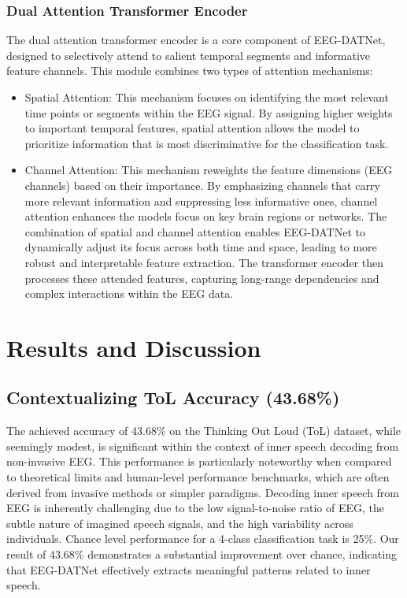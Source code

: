 \documentclass[pdflatex,sn-mathphys-num]{sn-jnl}
\theoremstyle{thmstyleone}%
\theoremstyle{thmstyletwo}%
\theoremstyle{thmstylethree}%
\begin{document}
\subsubsection{Dual Attention Transformer Encoder}

The dual attention transformer encoder is a core component of EEG-DATNet, designed to selectively attend to salient temporal segments and informative feature channels. This module combines two types of attention mechanisms:

\begin{itemize}
\item Spatial Attention: This mechanism focuses on identifying the most relevant time points or segments within the EEG signal. By assigning higher weights to important temporal features, spatial attention allows the model to prioritize information that is most discriminative for the classification task.
\item Channel Attention: This mechanism reweights the feature dimensions (EEG channels) based on their importance. By emphasizing channels that carry more relevant information and suppressing less informative ones, channel attention enhances the model\textquotesingle s focus on key brain regions or networks. The combination of spatial and channel attention enables EEG-DATNet to dynamically adjust its focus across both time and space, leading to more robust and interpretable feature extraction. The transformer encoder then processes these attended features, capturing long-range dependencies and complex interactions within the EEG data.
\end{itemize}

\section{Results and Discussion}

\subsection{Contextualizing ToL Accuracy (43.68\%)}

The achieved accuracy of 43.68\% on the Thinking Out Loud (ToL) dataset, while seemingly modest, is significant within the context of inner speech decoding from non-invasive EEG. This performance is particularly noteworthy when compared to theoretical limits and human-level performance benchmarks, which are often derived from invasive methods or simpler paradigms. Decoding inner speech from EEG is inherently challenging due to the low signal-to-noise ratio of EEG, the subtle nature of imagined speech signals, and the high variability across individuals. Chance level performance for a 4-class classification task is 25\%. Our result of 43.68\% demonstrates a substantial improvement over chance, indicating that EEG-DATNet effectively extracts meaningful patterns related to inner speech.
\end{document}
